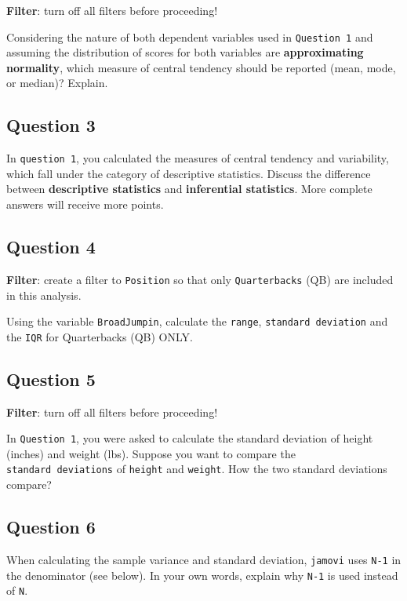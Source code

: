 \documentclass[
]{article}
\begin{document}
\textbf{Filter}: turn off all filters before proceeding!

Considering the nature of both dependent variables used in
\texttt{Question\ 1} and assuming the distribution of scores for both
variables are \textbf{approximating normality}, which measure of central
tendency should be reported (mean, mode, or median)? Explain.

\hypertarget{question-3}{%
\subsection{Question 3}\label{question-3}}

In \texttt{question\ 1}, you calculated the measures of central tendency
and variability, which fall under the category of descriptive
statistics. Discuss the difference between \textbf{descriptive
statistics} and \textbf{inferential statistics}. More complete answers
will receive more points.

\hypertarget{question-4}{%
\subsection{Question 4}\label{question-4}}

\textbf{Filter}: create a filter to \texttt{Position} so that only
\texttt{Quarterbacks} (QB) are included in this analysis.

Using the variable \texttt{BroadJumpin}, calculate the \texttt{range},
\texttt{standard\ deviation} and the \texttt{IQR} for Quarterbacks (QB)
ONLY.

\hypertarget{question-5}{%
\subsection{Question 5}\label{question-5}}

\textbf{Filter}: turn off all filters before proceeding!

In \texttt{Question\ 1}, you were asked to calculate the standard
deviation of height (inches) and weight (lbs). Suppose you want to
compare the \texttt{standard\ deviations} of \texttt{height} and
\texttt{weight}. How the two standard deviations compare?

\hypertarget{question-6}{%
\subsection{Question 6}\label{question-6}}

When calculating the sample variance and standard deviation,
\texttt{jamovi} uses \texttt{N-1} in the denominator (see below). In
your own words, explain why \texttt{N-1} is used instead of \texttt{N}.
\end{document}
